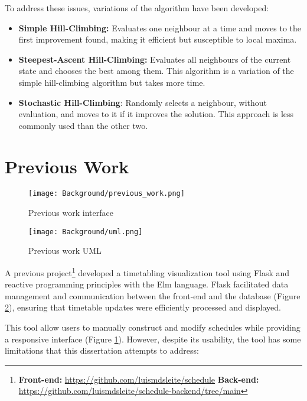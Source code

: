 To address these issues, variations of the algorithm have been developed:

\begin{itemize}
\item \textbf{Simple Hill-Climbing:} Evaluates one neighbour at a time and moves to the first improvement found, making it efficient but susceptible to local maxima.
\item \textbf{Steepest-Ascent Hill-Climbing:} Evaluates all neighbours of the current state and chooses the best among them. This algorithm is a variation of the simple hill-climbing algorithm but takes more time.
\item \textbf{Stochastic Hill-Climbing}: Randomly selects a neighbour, without evaluation, and moves to it if it improves the solution. This approach is less commonly used than the other two.
\end{itemize}

\section{Previous Work}

\begin{figure}
      \centering
      \texttt{[image: Background/previous\_work.png]}
      \caption[Previous work interface]
      {Previous work interface}
      \label{fig:previous_work_interface}
\end{figure}

\begin{figure}
      \centering
      \texttt{[image: Background/uml.png]}
      \caption[Previous work UML]
      {Previous work UML}
      \label{fig:previous_work_uml}
\end{figure}

A previous project\footnote{\textbf{Front-end:} \url{https://github.com/luismdsleite/schedule} \textbf{Back-end:} \url{https://github.com/luismdsleite/schedule-backend/tree/main}} developed a timetabling visualization tool using Flask and reactive programming principles with the Elm language. Flask facilitated data management and communication between the front-end and the database (Figure \ref{fig:previous_work_uml}), ensuring that timetable updates were efficiently processed and displayed. 

This tool allow users to manually construct and modify schedules while providing a responsive interface (Figure \ref{fig:previous_work_interface}). However, despite its usability, the tool has some limitations that this dissertation attempts to address:

